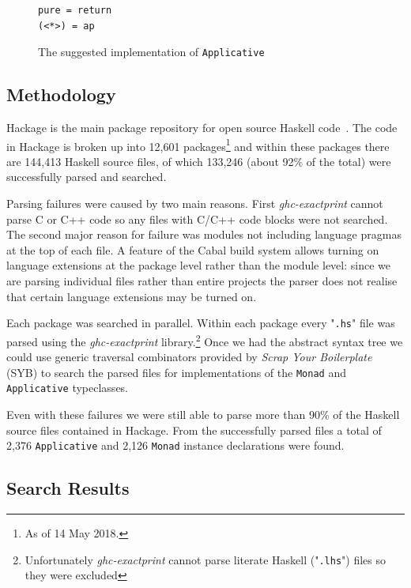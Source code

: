 \begin{figure}[t]
\begin{lstlisting}
pure = return
(<*>) = ap
\end{lstlisting}
\caption{The suggested implementation of \texttt{Applicative}}
\label{appSugImp}
\end{figure}

\subsection{Methodology}

Hackage is the main package repository for open source Haskell code~\citep{hackage}. The code in Hackage is broken up into 12,601 packages\footnote{As of 14 May 2018.} and within these packages there are 144,413 Haskell source files, of which 133,246 (about 92\% of the total) were successfully parsed and searched. 

Parsing failures were caused by two main reasons. First \textit{ghc-exactprint} cannot parse C or C++ code so any files with C/C++ code  blocks were not searched. The second major reason for failure was modules not including language pragmas at the top of each file. A feature of the Cabal build system allows turning on language extensions at the package level rather than the module level: since we are parsing individual files rather than entire projects the parser does not realise that certain language extensions may be turned on.

Each package was searched in parallel. Within each package every "\texttt{.hs}" file was parsed using the \textit{ghc-exactprint} library.\footnote{Unfortunately \textit{ghc-exactprint} cannot parse literate Haskell ("\texttt{.lhs}") files so they were excluded} Once we had the abstract syntax tree we could use generic traversal combinators provided by \textit{Scrap Your Boilerplate} (SYB) to search the parsed files for implementations of the \texttt{Monad} and \texttt{Applicative} typeclasses.


Even with these failures we were still able to parse more than 90\% of the Haskell source files contained in Hackage. From the successfully parsed files a total of 2,376 \texttt{Applicative} and 2,126 \texttt{Monad} instance declarations were found.

\subsection{Search Results}

